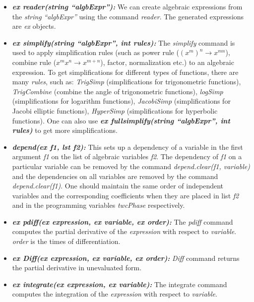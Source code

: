 \documentclass[prd,aps,floats,showkeys,nofootinbib,notitlepage]{revtex4-2}
\begin{document}
\begin{itemize}
		\item[] {\em \textbf{ex reader(string ``algbExpr''):}} We can create algebraic expressions from the {\em string} {\em ``algbExpr''} using the command {\em reader}. The generated expressions are {\em ex } objects.
		\item[] {\em \textbf{ex simplify(string ``algbExpr'', int rules):}} The {\em simplify} command is used to apply simplification rules (such as power rule ($(x^m)^n\rightarrow x^{mn}$), combine rule ($x^mx^n\rightarrow x^{m+n}$), factor, normalization etc.) to an algebraic expression. To get simplifications for different types of functions, there are many \textit{rules}, such as: \textit{TrigSimp} (simplifications for trigonometric functions), \textit{TrigCombine} (combine the angle of trigonometric functions), \textit{logSimp} (simplifications for logarithm functions), \textit{JacobiSimp} (simplifications for Jacobi elliptic functions), \textit{HyperSimp} (simplifications for hyperbolic functions).
		One can also use {\em \textbf{ex fullsimplify(string ``algbExpr'', int rules)}} to get more simplifications.
		
		\item[] {\em \textbf{depend(ex f1, lst f2):}} This sets up a dependency of a variable in the first argument {\em f1} on the list of algebraic variables {\em f2}. The dependency of {\em f1} on a particular variable can be removed by the command {\em depend.clear(f1, variable)} and the dependencies on all variables are removed by the command {\em depend.clear(f1)}.
		One should maintain the same order of independent variables and the corresponding coefficients when they are placed in list {\em f2} and in the programming variables {\em twcPhase} respectively. 
		\item[] {\em \textbf{ex pdiff(ex expression, ex variable, ex order):}} The {\em pdiff} command computes the partial derivative of the {\em expression} with respect to {\em variable}. {\em order} is the times of differentiation.
		\item[] {\em \textbf{ex Diff(ex expression, ex variable, ex order):}} {\em Diff} command returns the partial derivative in unevaluated form.
		\item[] {\em \textbf{ex integrate(ex expression, ex variable):}} The integrate command computes the integration of the {\em expression} with respect to {\em variable}. 
		

\end{itemize}
\end{document}
